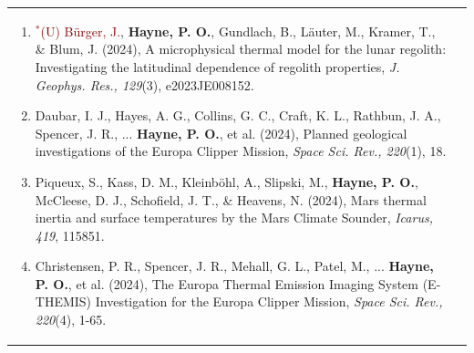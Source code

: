 \documentclass[letterpaper,10pt,twoside]{article}
\begin{document}
\begin{longtable}{@{} p{} p{}}
\begin{enumerate}[leftmargin=!,labelindent=2.5pt,itemindent=-10pt]
{            }
            \item{\small \textcolor{darkred}{$^*$(U) Bürger, J.}, \textbf{Hayne, P. O.}, Gundlach, B., Läuter, M., Kramer, T., \& Blum, J. (2024), A microphysical thermal model for the lunar regolith: Investigating the latitudinal dependence of regolith properties, \textit{J. Geophys. Res., 129}(3), e2023JE008152.
            }
            \item{\small Daubar, I. J., Hayes, A. G., Collins, G. C., Craft, K. L., Rathbun, J. A., Spencer, J. R., ... \textbf{Hayne, P. O.}, et al. (2024), Planned geological investigations of the Europa Clipper Mission, \textit{Space Sci. Rev., 220}(1), 18.
            }
            \item{\small Piqueux, S., Kass, D. M., Kleinböhl, A., Slipski, M., \textbf{Hayne, P. O.}, McCleese, D. J., Schofield, J. T., \& Heavens, N. (2024), Mars thermal inertia and surface temperatures by the Mars Climate Sounder, \textit{Icarus, 419}, 115851.
            }
            \item{\small Christensen, P. R., Spencer, J. R., Mehall, G. L., Patel, M., ... \textbf{Hayne, P. O.}, et al. (2024), The Europa Thermal Emission Imaging System (E-THEMIS) Investigation for the Europa Clipper Mission, \textit{Space Sci. Rev., 220}(4), 1-65.
            }
        \end{enumerate}\\


\end{longtable}
\end{document}
